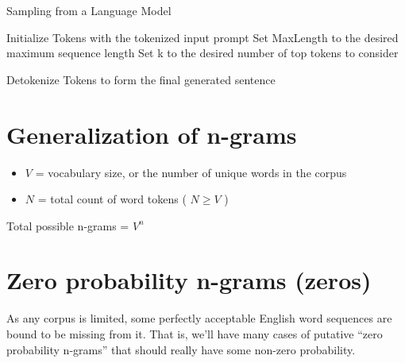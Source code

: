 \begin{algorithm}
    \caption{Sampling from a Language Model}
    Initialize Tokens with the tokenized input prompt\;
    Set MaxLength to the desired maximum sequence length\;
    Set k to the desired number of top tokens to consider\;
    
    
    Detokenize Tokens to form the final generated sentence\;
\end{algorithm}


\section{Generalization of n-grams \cite{nlp-1}}
\begin{itemize}
    \item $V$ = vocabulary size, or the number of unique words in the corpus
    \item $N$ = total count of word tokens ( $N \geq V$ )
\end{itemize}

Total possible n-grams = $V^n$

\section{Zero probability n-grams (zeros) \cite{nlp-1}}

As any corpus is limited, some perfectly acceptable English word sequences are bound to be missing from it. That is, we’ll have many cases of putative “zero probability n-grams” that should really have some non-zero probability.

